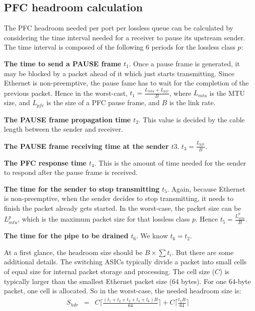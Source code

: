 \begin{appendices}
\section{PFC headroom calculation}\label{APPHEADROOM}

The PFC headroom needed per port per lossless queue can be calculated by
		considering the time interval needed for a receiver to pause its
		upstream sender. The time interval is composed of the following 6
		periods for the lossless class $p$:

	
\noindent\textbf{The time to send a PAUSE frame $t_1$}.  Once a pause frame is
		generated, it may be blocked by a packet ahead of it which just starts
		transmitting. Since Ethernet is non-preemptive, the pause fame has to
		wait for the completion of the previous packet. Hence in the worst-cast,
		$t_1 = \frac{ L_{mtu} + L_{pfc}}{B}$, where $L_{mtu}$ is the MTU size,
		and $L_{pfc}$ is the size of a PFC pause frame, and $B$ is the link
		rate.


\noindent\textbf{The PAUSE frame propagation time $t_2$}. This value is decided
		by the cable length between the sender and receiver.

\noindent\textbf{The PAUSE frame receiving time at the sender $t3$}.
		$t_3=\frac{L_{pfc}}{B}$.

\noindent\textbf{The PFC response time $t_4$}. This is the amount of time needed
		for the sender to respond after the pause frame is received.

\noindent\textbf{The time for the sender to stop transmitting $t_5$}. Again,
		because Ethernet is non-preemptive, when the sender decides to stop
		transmitting, it needs to finish the packet already gets started. In the
		worst-case, the packet size can be $L^{p}_{mtu}$, which is the maximum
		packet size for that lossless class $p$. Hence $t_5 =
		\frac{L^{p}_{mtu}}{B}$.

\noindent\textbf{The time for the pipe to be drained $t_6$}. We know $t_6 =
		t_2$.


At a first glance, the headroom size should be $B\times\sum t_i$. But there are
some additional details. The switching ASICs typically divide a packet
into small cells of equal size for internal packet storage and
processing. The cell size ($C$) is typically larger than the smallest
Ethernet packet size (64 bytes). For one 64-byte packet, one cell is
allocated. So in the worst-case, the needed headroom size is:
\begin{eqnarray} \label{eqn:pfcheadroom} S_{hdr} & = &
C\lceil\frac{(t_1+t_2+t_3+t_4 + t_6)B}{64}\rceil + C\lceil \frac{t_5
B}{64}\rceil \nonumber \end{eqnarray}


\end{appendices}
